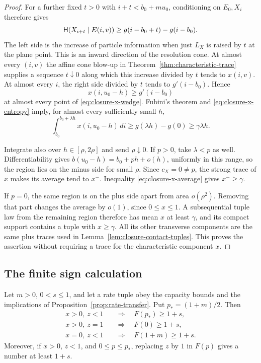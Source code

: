 \begin{proof}
For a further fixed $t>0$ with $i+t<b_0+mu_0$, conditioning on
$E_0,X_i$ therefore gives
\begin{equation}
 \mathsf H(X_{i+t}\mid E(i,v))
 \ge g(i-b_0+t)-g(i-b_0).
 \label{eq:closure-x-increment}
\end{equation}
The left side is the increase of particle information when just
$L_X$ is raised by $t$ at the plane point.  This is an inward
direction of the resolution cone.  At almost every $(i,v)$ the
affine cone blow-up in Theorem~\ref{thm:characteristic-trace} supplies
a sequence $t\downarrow0$ along which this increase divided by $t$
tends to $x(i,v)$.  At almost every $i$, the right side divided by
$t$ tends to $g'(i-b_0)$.  Hence
\[
 x(i,u_0-h)\ge g'(i-b_0)
\]
at almost every point of \eqref{eq:closure-x-wedge}.  Fubini's theorem
and \eqref{eq:closure-x-entropy} imply, for almost every sufficiently
small $h$,
\begin{equation}
 \int_{b_0}^{b_0+\lambda h}x(i,u_0-h)\,di
 \ge g(\lambda h)-g(0)\ge\gamma\lambda h.
 \label{eq:closure-x-average}
\end{equation}

Integrate also over $h\in[\rho,2\rho]$ and send $\rho\downarrow0$.
If $p>0$, take $\lambda<p$ as well.  Differentiability gives
$b(u_0-h)=b_0+ph+o(h)$, uniformly in this range, so the region lies
on the minus side for small $\rho$.  Since $c_X=0\ne p$, the strong
trace of $x$ makes its average tend to $x^-$.  Inequality
\eqref{eq:closure-x-average} gives $x^-\ge\gamma$.

If $p=0$, the same region is on the plus side apart from area
$o(\rho^2)$.  Removing that part changes the average by $o(1)$,
since $0\le x\le1$.  A subsequential tuple law from the remaining
region therefore has mean $x$ at least $\gamma$, and its compact
support contains a tuple with $x\ge\gamma$.  All its other
transverse components are the same plus traces used in
Lemma~\ref{lem:closure-contact-tuples}.  This proves the assertion
without requiring a trace for the characteristic component $x$.
\end{proof}

\subsection{The finite sign calculation}

\begin{lemma}
\label{lem:closure-sign-algebra}
Let $m>0$, $0<s\le1$, and let a rate tuple obey the capacity bounds
and the implications of Proposition~\ref{prop:rate-transfer}.  Put
$p_*=(1+m)/2$.  Then
\begin{align}
 x>0,\ z<1&\quad\Longrightarrow\quad F(p_*)\ge1+s,
 \label{eq:closure-midpoint}\\
 x>0,\ z=1&\quad\Longrightarrow\quad F(0)\ge1+s,
 \label{eq:closure-left-end}\\
 x=0,\ z<1&\quad\Longrightarrow\quad F(1+m)\ge1+s.
 \label{eq:closure-right-end}
\end{align}
Moreover, if $x>0$, $z<1$, and $0\le p\le p_*$, replacing $z$ by
$1$ in $F(p)$ gives a number at least $1+s$.
\end{lemma}

